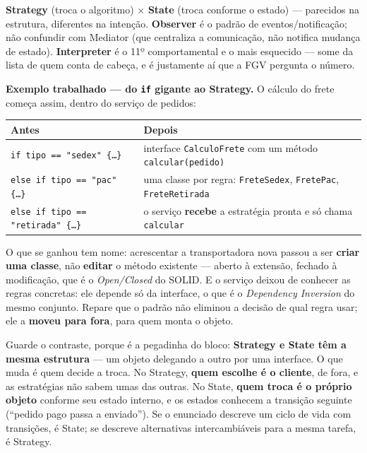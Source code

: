 \begin{pegadinha}
\textbf{Strategy} (troca o algoritmo) $\times$ \textbf{State} (troca conforme
o estado) --- parecidos na estrutura, diferentes na intenção.
\textbf{Observer} é o padrão de eventos/notificação; não confundir com
Mediator (que centraliza a comunicação, não notifica mudança de estado).
\textbf{Interpreter} é o 11º comportamental e o mais esquecido --- some da
lista de quem conta de cabeça, e é justamente aí que a FGV pergunta o número.
\end{pegadinha}

\textbf{Exemplo trabalhado --- do \texttt{if} gigante ao Strategy.} O cálculo
do frete começa assim, dentro do serviço de pedidos:

\begin{center}
\begin{tabular}{@{}p{5.6cm}p{6cm}@{}}
\toprule
\textbf{Antes} & \textbf{Depois} \\
\midrule
\texttt{if tipo == "sedex" \{\ldots\}} & interface \texttt{CalculoFrete} com um
método \texttt{calcular(pedido)} \\
\texttt{else if tipo == "pac" \{\ldots\}} & uma classe por regra:
\texttt{FreteSedex}, \texttt{FretePac}, \texttt{FreteRetirada} \\
\texttt{else if tipo == "retirada" \{\ldots\}} & o serviço \textbf{recebe} a
estratégia pronta e só chama \texttt{calcular} \\
\bottomrule
\end{tabular}
\end{center}

O que se ganhou tem nome: acrescentar a transportadora nova passou a ser
\textbf{criar uma classe}, não \textbf{editar} o método existente --- aberto à
extensão, fechado à modificação, que é o \emph{Open/Closed} do SOLID. E o
serviço deixou de conhecer as regras concretas: ele depende só da interface, o
que é o \emph{Dependency Inversion} do mesmo conjunto. Repare que o padrão não
eliminou a decisão de qual regra usar; ele a \textbf{moveu para fora}, para
quem monta o objeto.

Guarde o contraste, porque é a pegadinha do bloco: \textbf{Strategy e State têm
a mesma estrutura} --- um objeto delegando a outro por uma interface. O que
muda é quem decide a troca. No Strategy, \textbf{quem escolhe é o cliente}, de
fora, e as estratégias não sabem umas das outras. No State, \textbf{quem troca
é o próprio objeto} conforme seu estado interno, e os estados conhecem a
transição seguinte (``pedido pago passa a enviado''). Se o enunciado descreve
um ciclo de vida com transições, é State; se descreve alternativas
intercambiáveis para a mesma tarefa, é Strategy.

